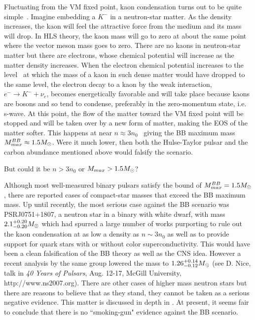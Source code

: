 \documentclass[aps,twocolumn,preprintnumbers,%
superscriptaddress,floatfix]{revtex4}
\begin{document}
Fluctuating from the VM fixed point,  kaon condensation turns out to
be quite simple~\cite{BLPR-kaoncon,BLR-kaon07}. Imagine embedding  a
$K^{-}$ in a neutron-star matter. As the density increases, the kaon
will feel the attractive force from the medium and its mass will
drop. In HLS theory, the kaon mass will go to zero at about the same
point where the vector meson mass goes to zero. There are no kaons
in neutron-star matter but there are electrons, whose chemical
potential will increase as the matter density increases. When the
electron chemical potential increases to the level~\cite{footnote1}
at which the mass of a kaon in such dense matter would have dropped
to the same level, the electron decay to a kaon  by the weak
interaction, $e^-\rightarrow K^- +\nu_e$, becomes energetically
favorable and will take place because kaons are bosons and so tend
to condense, preferably in the zero-momentum state, i.e. s-wave. At
this point, the flow of the matter toward the VM fixed point will be
stopped and will be taken over by a new form of matter, making the
EOS of the matter softer. This happens at near $n\approx
3n_0$~\cite{BLR-kaon07} giving the BB maximum mass
$M^{BB}_{max}\approx 1.5\mbox{$M_\odot$}$. Were it much lower, then both the
Hulse-Taylor pulsar and the carbon abundance  mentioned above would
falsify the scenario.

But could it be $n > 3n_0$ or $M_{max} > 1.5\mbox{$M_\odot$}$?


Although most well-measured binary pulsars satisfy the bound of $M_{max}^{BB}=1.5\mbox{$M_\odot$}$, there are reported cases of compact-star masses that exceed the BB maximum mass. Up until recently, the most serious case against the BB scenario was PSRJ0751$+$1807, a neutron star in a binary with white dwarf,  with mass $2.1^{+0.20}_{-0.20} \mbox{$M_\odot$}$
\cite{Nice05} which had spurred a large number of works purporting to rule out the  kaon condensation at as low a density as $n\sim 3n_0$ as well as to provide support for quark stars with or without color superconductivity.  This would have been a clean falsification of the BB theory as well as the CNS idea. However a recent analysis by the same group lowered the mass to $1.26^{+0.14}_{-0.12} \mbox{$M_\odot$}$ (see D. Nice, talk in {\it 40 Years of Pulsars}, Aug. 12-17, McGill University, http://www.ns2007.org). There are other cases of higher mass neutron stars but there are reasons to believe that as they stand, they cannot be taken as a serious negative evidence. This matter is discussed in depth in \cite{BLR-kaon07}. At present, it seems fair to conclude that  there is no ``smoking-gun" evidence against the BB scenario.
\end{document}
